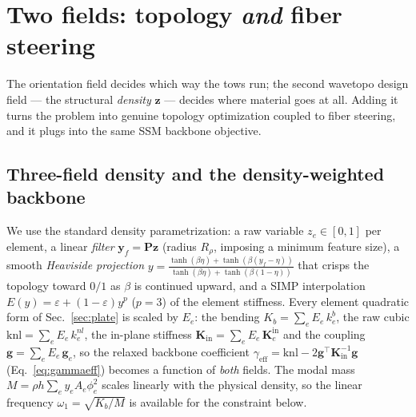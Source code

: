 \documentclass[11pt]{article}
\begin{document}
\section{Two fields: topology \emph{and} fiber steering}\label{sec:topopt}

The orientation field decides which way the tows run; the second wavetopo design
field --- the structural \emph{density} $\bm z$ --- decides where material goes at
all. Adding it turns the problem into genuine topology optimization coupled to
fiber steering, and it plugs into the same SSM backbone objective.

\subsection{Three-field density and the density-weighted backbone}
We use the standard density parametrization: a raw variable $z_e\in[0,1]$ per
element, a linear \emph{filter} $\bm y_f=\bm P\bm z$ (radius $R_\rho$, imposing a
minimum feature size), a smooth \emph{Heaviside projection}
$y=\tfrac{\tanh(\beta\eta)+\tanh(\beta(y_f-\eta))}{\tanh(\beta\eta)+\tanh(\beta(1-\eta))}$
that crisps the topology toward $0/1$ as $\beta$ is continued upward, and a SIMP
interpolation $E(y)=\varepsilon+(1-\varepsilon)y^{p}$ ($p=3$) of the element
stiffness. Every element quadratic form of Sec.~\ref{sec:plate} is scaled by
$E_e$: the bending $K_b=\sum_e E_e\,k^b_e$, the raw cubic
$\mathrm{knl}=\sum_e E_e\,k^{nl}_e$, the in-plane stiffness
$\bm K_{\mathrm{in}}=\sum_e E_e\,\bm K^{\mathrm{in}}_e$ and the coupling
$\bm g=\sum_e E_e\,\bm g_e$, so the relaxed backbone coefficient
$\gamma_{\mathrm{eff}}=\mathrm{knl}-2\bm g^{\!\top}\bm K_{\mathrm{in}}^{-1}\bm g$
(Eq.~\eqref{eq:gammaeff}) becomes a function of \emph{both} fields. The modal mass
$M=\rho h\sum_e y_e A_e\phi_e^2$ scales linearly with the physical density, so the
linear frequency $\omega_1=\sqrt{K_b/M}$ is available for the constraint below.
\end{document}
